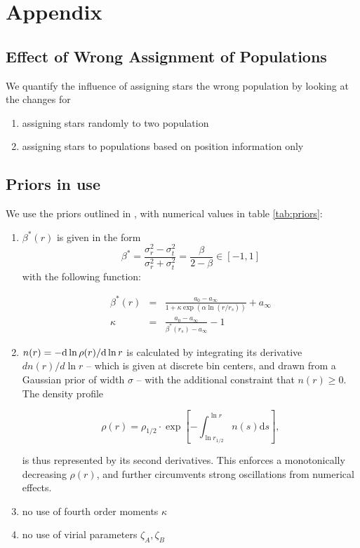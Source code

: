 \section{Appendix}

\subsection{Effect of Wrong Assignment of Populations}
We quantify the influence of assigning stars the wrong population by
looking at the changes for

\begin{enumerate}
\item assigning stars randomly to two population
\item assigning stars to populations based on position information
  only
\end{enumerate}


\subsection{Priors in use}
We use the priors outlined in \citep{Steger+2014}, with numerical
values in table \ref{tab:priors}:

\begin{enumerate}
  \item $\beta^*(r)$ is given in the form
    \begin{equation}\label{eqn:betastar}
      \beta^* = \frac{\sigma_r^2-\sigma_t^2}{\sigma_r^2+\sigma_t^2} = \frac{\beta}{2-\beta} \in [-1,1]
    \end{equation}
    with the following function:

    \begin{eqnarray} \label{eqn:nonparabetstar}
      \beta^*(r) &=& \frac{a_0-a_\infty}{1+\kappa \exp(\alpha\ln(r/r_s))}+a_\infty\\
      \kappa &=& \frac{a_0-a_\infty}{\beta^*(r_s)-a_\infty}-1
    \end{eqnarray}


  \item $n(r)=-{\rm d}\ln\rho(r)/{\rm d}\ln r$ is calculated by integrating its
    derivative $dn(r)/d\ln r$ -- which is given at discrete bin
    centers, and drawn from a Gaussian prior of width $\sigma$ -- with
    the additional constraint that $n(r)\geq0$. The density profile

    \begin{equation*}
      \rho(r) = \rho_{1/2}\cdot\exp\left[-\int_{\ln r_{1/2}}^{\ln r}n(s)\text{d}s\right],
    \end{equation*}

    is thus represented by its second derivatives. This enforces a
    monotonically decreasing $\rho(r)$, and further circumvents strong
    oscillations from numerical effects.

  \item no use of fourth order moments $\kappa$
  \item no use of virial parameters $\zeta_A, \zeta_B$
\end{enumerate}



